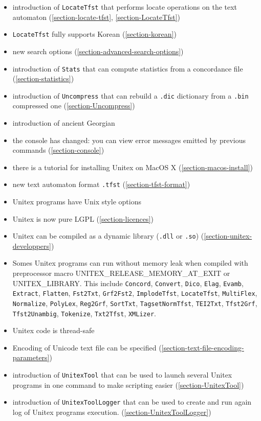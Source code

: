 \begin{itemize}
  \item introduction of \verb$LocateTfst$ that performs locate operations
        on the text automaton (\ref{section-locate-tfst}, \ref{section-LocateTfst})
  \item \verb$LocateTfst$ fully supports Korean (\ref{section-korean})
  \item new search options (\ref{section-advanced-search-options})
  \item introduction of \verb$Stats$ that can compute statistics from a
        concordance file (\ref{section-statistics})
  \item introduction of \verb$Uncompress$ that can rebuild a \verb$.dic$
        dictionary from a \verb$.bin$ compressed one (\ref{section-Uncompress})
  \item introduction of ancient Georgian
  \item the console has changed: you can view error messages emitted by
        previous commands (\ref{section-console})
  \item there is a tutorial for installing Unitex on MacOS X 
       (\ref{section-macos-install})
  \item new text automaton format \verb+.tfst+ (\ref{section-tfst-format})          
  \item Unitex programs have Unix style options
  \item Unitex is now pure LGPL (\ref{section-licences})
  \item Unitex can be compiled as a dynamic library (\verb$.dll$ or \verb$.so$)
  (\ref{section-unitex-developpers})
  \item Somes Unitex programs can run without memory leak when compiled with preprocessor
  macro UNITEX\_RELEASE\_MEMORY\_AT\_EXIT or UNITEX\_LIBRARY.
  This include \verb$Concord$, \verb$Convert$, \verb$Dico$, \verb$Elag$, \verb$Evamb$, \verb$Extract$, \verb$Flatten$, \verb$Fst2Txt$, \verb$Grf2Fst2$, \verb$ImplodeTfst$, \verb$LocateTfst$, \verb$MultiFlex$, \verb$Normalize$, \verb$PolyLex$, \verb$Reg2Grf$, \verb$SortTxt$, \verb$TagsetNormTfst$, \verb$TEI2Txt$, \verb$Tfst2Grf$, \verb$Tfst2Unambig$, \verb$Tokenize$, \verb$Txt2Tfst$, \verb$XMLizer$.
  \item Unitex code is thread-safe
  \item Encoding of Unicode text file can be specified (\ref{section-text-file-encoding-parameters})
  \item introduction of \verb$UnitexTool$ that can be used to launch several
  Unitex programs in one command to make scripting easier
  (\ref{section-UnitexTool})
  \item introduction of \verb$UnitexToolLogger$ that can be used to create and
  run again log of Unitex programs execution.
  (\ref{section-UnitexToolLogger})
\end{itemize}

